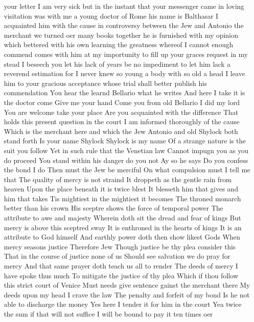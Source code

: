 your letter I am very sick but in the instant that 
your messenger came in loving visitation was with 
me a young doctor of Rome his name is Balthasar I 
acquainted him with the cause in controversy between 
the Jew and Antonio the merchant we turned oer 
many books together he is furnished with my 
opinion which bettered with his own learning the 
greatness whereof I cannot enough commend comes 
with him at my importunity to fill up your graces 
request in my stead I beseech you let his lack of 
years be no impediment to let him lack a reverend 
estimation for I never knew so young a body with so 
old a head I leave him to your gracious 
acceptance whose trial shall better publish his 
commendation 
You hear the learnd Bellario what he writes 
And here I take it is the doctor come 
Give me your hand Come you from old Bellario 
I did my lord 
You are welcome take your place 
Are you acquainted with the difference 
That holds this present question in the court 
I am informed thoroughly of the cause 
Which is the merchant here and which the Jew 
Antonio and old Shylock both stand forth 
Is your name Shylock 
Shylock is my name 
Of a strange nature is the suit you follow 
Yet in such rule that the Venetian law 
Cannot impugn you as you do proceed 
You stand within his danger do you not 
Ay so he says 
Do you confess the bond 
I do 
Then must the Jew be merciful 
On what compulsion must I tell me that 
The quality of mercy is not straind 
It droppeth as the gentle rain from heaven 
Upon the place beneath it is twice blest 
It blesseth him that gives and him that takes 
Tis mightiest in the mightiest it becomes 
The throned monarch better than his crown 
His sceptre shows the force of temporal power 
The attribute to awe and majesty 
Wherein doth sit the dread and fear of kings 
But mercy is above this sceptred sway 
It is enthroned in the hearts of kings 
It is an attribute to God himself 
And earthly power doth then show likest Gods 
When mercy seasons justice Therefore Jew 
Though justice be thy plea consider this 
That in the course of justice none of us 
Should see salvation we do pray for mercy 
And that same prayer doth teach us all to render 
The deeds of mercy I have spoke thus much 
To mitigate the justice of thy plea 
Which if thou follow this strict court of Venice 
Must needs give sentence gainst the merchant there 
My deeds upon my head I crave the law 
The penalty and forfeit of my bond 
Is he not able to discharge the money 
Yes here I tender it for him in the court 
Yea twice the sum if that will not suffice 
I will be bound to pay it ten times oer 
